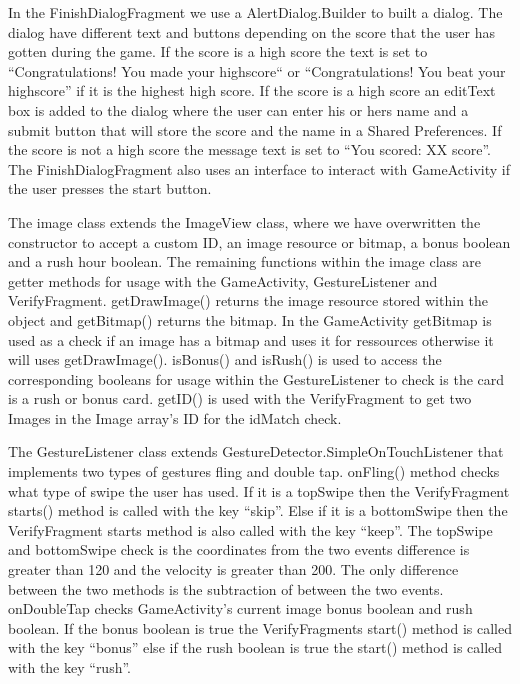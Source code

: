 In the FinishDialogFragment we use a AlertDialog.Builder to built a dialog. The dialog have different text and buttons depending on the score that the user has gotten during the game. If the score is a high score the text is set to “Congratulations! You made your highscore“ or “Congratulations! You beat your highscore” if it is the highest high score. If the score is a high score an editText box is added to the dialog where the user can enter his or hers name and a submit button that will store the score and the name in a Shared Preferences. If the score is not a high score the message text is set to “You scored: XX score”.
The FinishDialogFragment also uses an interface to interact with GameActivity if the user presses the start button. \newline

The image class extends the ImageView class, where we have overwritten the constructor to accept a custom ID, an image resource or bitmap, a bonus boolean and a rush hour boolean. The remaining functions within the image class are getter methods for usage with the GameActivity, GestureListener and VerifyFragment. getDrawImage() returns the image resource stored within the object and getBitmap() returns the bitmap. In the GameActivity getBitmap is used as a check if an image has a bitmap and uses it for ressources otherwise it will uses getDrawImage(). isBonus() and isRush() is used to access the corresponding booleans for usage within the GestureListener to check is the card is a rush or bonus card. getID() is used with the VerifyFragment to get two Images in the Image array’s ID for the idMatch check. \newline

The GestureListener class extends GestureDetector.SimpleOnTouchListener that implements two types of gestures fling and double tap. onFling() method checks what type of swipe the user has used. If it is a topSwipe then the VerifyFragment starts() method is called with the key “skip”. Else if it is a bottomSwipe then the VerifyFragment starts method is also called with the key “keep”. The topSwipe and bottomSwipe check is the coordinates from the two events difference is greater than 120 and the velocity is greater than 200. The only difference between the two methods is the subtraction of between the two events. onDoubleTap checks GameActivity’s current image bonus boolean and rush boolean. If the bonus boolean is true the VerifyFragments start() method is called with the key “bonus” else if the rush boolean is true the start() method is called with the key “rush”. \newline

